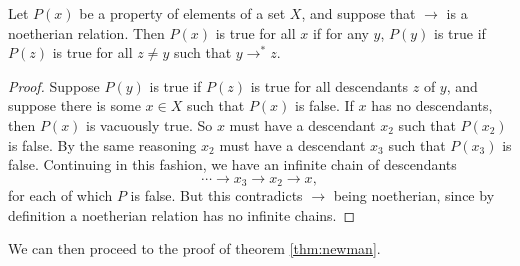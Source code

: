 \documentclass[11pt,libertine,widepage,nosubthm]{lmaths}
\begin{document}
\begin{prop}
	Let $P(x)$ be a property of elements of a set $X$, and suppose that $\rightarrow$ is a noetherian relation. Then $P(x)$ is true for all $x$ if for any $y$, $P(y)$ is true if $P(z)$ is true for all $z \ne y$ such that $y \rightarrow^* z$.
\end{prop}
\begin{proof}
	Suppose $P(y)$ is true if $P(z)$ is true for all descendants $z$ of $y$, and suppose there is some $x \in X$ such that $P(x)$ is false. If $x$ has no descendants, then $P(x)$ is vacuously true. So $x$ must have a descendant $x_2$ such that $P(x_2)$ is false. By the same reasoning $x_2$ must have a descendant $x_3$ such that $P(x_3)$ is false. Continuing in this fashion, we have an infinite chain of descendants
		\[ \cdots \to x_3 \to x_2 \to x, \]
	for each of which $P$ is false. But this contradicts $\to$ being noetherian, since by definition a noetherian relation has no infinite chains.
\end{proof}

We can then proceed to the proof of theorem \ref{thm:newman}.
\end{document}
